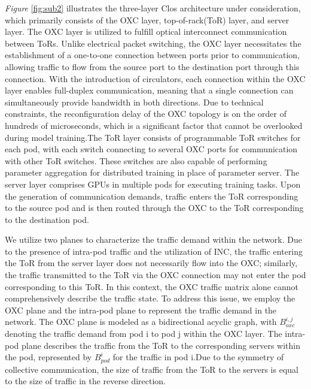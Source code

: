 \documentclass[conference]{IEEEtran}
\begin{document}
\emph{Figure} \ref{fig:sub2} illustrates the three-layer Clos architecture under consideration, which primarily consists of the OXC layer, top-of-rack(ToR) layer, and server layer. The OXC layer is utilized to fulfill optical interconnect communication between ToRs. Unlike electrical packet switching, the OXC layer necessitates the establishment of a one-to-one connection between ports prior to communication, allowing traffic to flow from the source port to the destination port through this connection. With the introduction of circulators, each connection within the OXC layer enables full-duplex communication, meaning that a single connection can simultaneously provide bandwidth in both directions. Due to technical constraints, the reconfiguration delay of the OXC topology is on the order of hundreds of microseconds, which is a significant factor that cannot be overlooked during model training.The ToR layer consists of programmable ToR switches for each pod, with each switch connecting to several OXC ports for communication with other ToR switches. These switches are also capable of performing parameter aggregation for distributed training in place of parameter server. The server layer comprises GPUs in multiple pods for executing training tasks. Upon the generation of communication demands, traffic enters the ToR corresponding to the source pod and is then routed through the OXC to the ToR corresponding to the destination pod.


We utilize two planes to characterize the traffic demand within the network. Due to the presence of intra-pod traffic and the utilization of INC, the traffic entering the ToR from the server layer does not necessarily flow into the OXC; similarly, the traffic transmitted to the ToR via the OXC connection may not enter the pod corresponding to this ToR. In this context, the OXC traffic matrix alone cannot comprehensively describe the traffic state. To address this issue, we employ the OXC plane and the intra-pod plane to represent the traffic demand in the network. The OXC plane is modeled as a bidirectional acyclic graph, with $B_{oxc}^{i,j}$ denoting the traffic demand from pod i to pod j within the OXC layer. The intra-pod plane describes the traffic from the ToR to the corresponding servers within the pod, represented by $B_{pod}^i$ for the traffic in pod i.Due to the symmetry of collective communication, the size of traffic from the ToR to the servers is equal to the size of traffic in the reverse direction.
\end{document}
